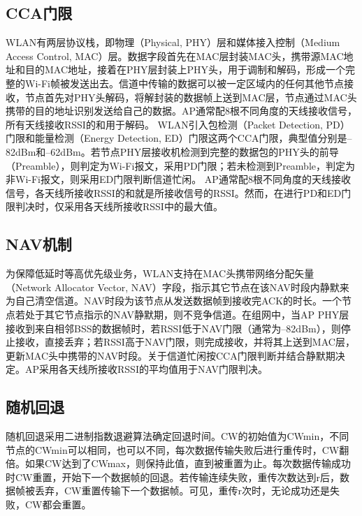 \documentclass[bwprint]{gmcmthesis}
\begin{document}
\subsection{CCA门限}
WLAN有两层协议栈，即物理（Physical, PHY）层和媒体接入控制（Medium Access Control, MAC）层。数据字段首先在MAC层封装MAC头，携带源MAC地址和目的MAC地址，接着在PHY层封装上PHY头，用于调制和解码，形成一个完整的Wi-Fi帧被发送出去。信道中传输的数据可以被一定区域内的任何其他节点接收，节点首先对PHY头解码，将解封装的数据帧上送到MAC层，节点通过MAC头携带的目的地址识别发送给自己的数据。AP通常配8根不同角度的天线接收信号，所有天线接收RSSI的和用于解码。
	WLAN引入包检测（Packet Detection, PD）门限和能量检测（Energy Detection, ED）门限这两个CCA门限，典型值分别是–82dBm和–62dBm。若节点PHY层接收机检测到完整的数据包的PHY头的前导（Preamble），则判定为Wi-Fi报文，采用PD门限；若未检测到Preamble，判定为非Wi-Fi报文，则采用ED门限判断信道忙闲。
AP通常配8根不同角度的天线接收信号，各天线所接收RSSI的和就是所接收信号的RSSI。然而，在进行PD和ED门限判决时，仅采用各天线所接收RSSI中的最大值。

\subsection{NAV机制}

	为保障低延时等高优先级业务，WLAN支持在MAC头携带网络分配矢量（Network Allocator Vector, NAV）字段，指示其它节点在该NAV时段内静默来为自己清空信道。NAV时段为该节点从发送数据帧到接收完ACK的时长。一个节点若处于其它节点指示的NAV静默期，则不竞争信道。在组网中，当AP PHY层接收到来自相邻BSS的数据帧时，若RSSI低于NAV门限（通常为–82dBm），则停止接收，直接丢弃；若RSSI高于NAV门限，则完成接收，并将其上送到MAC层，更新MAC头中携带的NAV时段。关于信道忙闲按CCA门限判断并结合静默期决定。AP采用各天线所接收RSSI的平均值用于NAV门限判决。

\subsection{随机回退}
	
随机回退采用二进制指数退避算法确定回退时间。CW的初始值为CWmin，不同节点的CWmin可以相同，也可以不同，每次数据传输失败后进行重传时，CW翻倍。如果CW达到了CWmax，则保持此值，直到被重置为止。每次数据传输成功时CW重置，开始下一个数据帧的回退。若传输连续失败，重传次数达到r后，数据帧被丢弃，CW重置传输下一个数据帧。可见，重传r次时，无论成功还是失败，CW都会重置。
\end{document}
